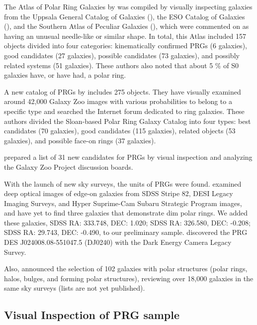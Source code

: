 \documentclass{aa}
\begin{document}
The Atlas of Polar Ring Galaxies by \cite{Whitmore1990} was compiled by visually inspecting galaxies from the Uppsala General Catalog of Galaxies (\cite{Nilson1973}), the ESO Catalog of Galaxies (\cite{Lauberts1982}), and the Southern Atlas of Peculiar Galaxies (\cite{Arp1987}), which were commented on as having an unusual needle-like or similar shape. In total, this Atlas included 157 objects divided into four categories: kinematically confirmed PRGs (6 galaxies), good candidates (27 galaxies), possible candidates (73 galaxies), and possibly related systems (51 galaxies). These authors also noted that about 5 \% of S0 galaxies have, or have had, a polar ring. 

A new catalog of PRGs by \cite{Moiseev2011} includes 275 objects. They have visually examined around 42,000 Galaxy Zoo images with various probabilities to belong to a specific type and searched the Internet forum dedicated to ring galaxies. These authors divided the Sloan-based Polar Ring Galaxy Catalog into four types: best candidates (70 galaxies), good candidates (115 galaxies), related objects (53 galaxies), and possible face-on rings (37 galaxies). 

\cite{Reshetnikov2019} prepared a list of 31 new candidates for PRGs by visual inspection and analyzing the Galaxy Zoo Project discussion boards.

With the launch of new sky surveys, the units of PRGs were found. \cite{Skryabina2024} examined deep optical images of edge-on galaxies from SDSS Stripe 82, DESI Legacy Imaging Surveys, and Hyper Suprime-Cam Subaru Strategic Program images, and have yet to find three galaxies that demonstrate dim polar rings. We added these galaxies, SDSS RA: 333.748, DEC: 1.020; SDSS RA: 326.580, DEC: -0.208;  SDSS RA: 29.743, DEC: -0.490, to our preliminary sample. \cite{Akhil2024} discovered the PRG DES J024008.08-551047.5 (DJ0240) with the Dark Energy Camera Legacy Survey. 


Also, \cite{Bahr2024} announced the selection of 102 galaxies with polar structures (polar rings, halos, bulges, and forming polar structures), reviewing over 18,000 galaxies in the same sky surveys (lists are not yet published). 

\subsection{Visual Inspection of PRG sample}
\end{document}
